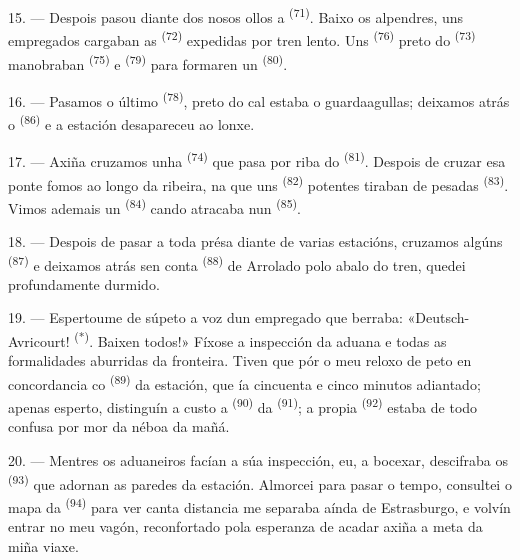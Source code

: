 
15. --- Despois pasou diante dos nosos ollos a 
\textsuperscript{(71)}. Baixo os alpendres, uns empregados cargaban as
 \textsuperscript{(72)} expedidas por tren lento. Uns
 \textsuperscript{(76)} preto do 
\textsuperscript{(73)} manobraban  \textsuperscript{(75)} e
 \textsuperscript{(79)} para formaren un  \textsuperscript{(80)}.

16. --- Pasamos o último  \textsuperscript{(78)}, preto do cal
estaba o guardaagullas; deixamos atrás o 
\textsuperscript{(86)} e a estación desapareceu ao lonxe.

17. --- Axiña cruzamos unha  \textsuperscript{(74)} que pasa
por riba do  \textsuperscript{(81)}. Despois de cruzar esa ponte fomos ao
longo da ribeira, na que uns  \textsuperscript{(82)} potentes
tiraban de pesadas  \textsuperscript{(83)}. Vimos ademais un
 \textsuperscript{(84)} cando atracaba nun 
\textsuperscript{(85)}.

18. --- Despois de pasar a toda présa diante de varias estacións, cruzamos algúns
 \textsuperscript{(87)} e deixamos atrás  sen conta
\textsuperscript{(88)} de  Arrolado polo abalo do tren,
quedei profundamente durmido.

\VUsaut{3.0mm}
\VUsaut{3.0mm}

19. --- Espertoume de súpeto a voz dun empregado que berraba: «Deutsch-Avricourt!
\textsuperscript{(*)}. Baixen todos!» Fíxose a inspección da aduana e todas as
formalidades aburridas da fronteira. Tiven que pór o meu reloxo de peto en
concordancia co  \textsuperscript{(89)} da estación, que ía
cincuenta e cinco minutos adiantado; apenas esperto, distinguín a custo a
 \textsuperscript{(90)} da 
\textsuperscript{(91)}; a propia  \textsuperscript{(92)} estaba de todo
confusa por mor da néboa da mañá.

20. --- Mentres os aduaneiros facían a súa inspección, eu, a bocexar, descifraba os
 \textsuperscript{(93)} que adornan as paredes da estación. Almorcei
para pasar o tempo, consultei o mapa da  \textsuperscript{(94)}
para ver canta distancia me separaba aínda de Estrasburgo, e volvín entrar no meu
vagón, reconfortado pola esperanza de acadar axiña a meta da miña viaxe.
